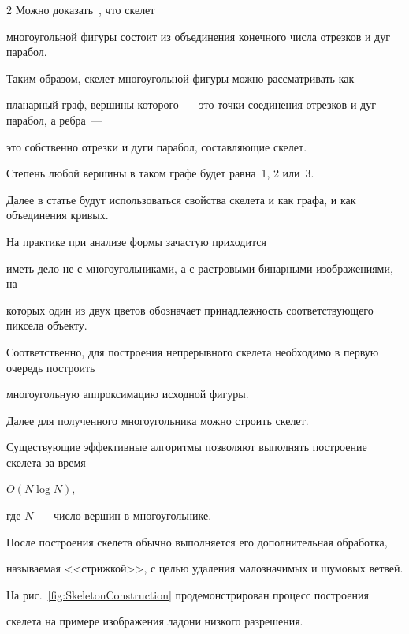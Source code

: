 \begin{multicols}{2}
Можно доказать~\cite{MestetskiySkeletonBezierCurves}, что скелет 


многоугольной фигуры состоит из объединения конечного числа отрезков и дуг парабол.


Таким образом, скелет многоугольной фигуры можно рассматривать как 


планарный граф, вершины которого~--- это точки соединения отрезков и дуг парабол, а ребра~--- 


это собственно отрезки и дуги парабол, составляющие скелет.


Степень любой вершины в таком графе будет рав\-на~1, 2 или~3.





Далее в статье будут использоваться свойства скелета и как графа, и как объединения кривых.





На практике при анализе формы зачастую приходится 


иметь дело не с многоугольниками, а с растровыми бинарными изображениями, на 


которых один из двух цветов обозначает принадлежность соответствующего пиксела объекту.


Соответственно, для построения непрерывного скелета необходимо в первую очередь построить 


многоугольную аппроксимацию исходной фигуры.


Далее для полученного многоугольника можно строить скелет.


Существующие эффективные алгоритмы позволяют выполнять построение скелета за время 


$O(N \log N)$,


где $N$~--- чис\-ло вершин в многоугольнике.


После построения скелета обычно выполняется его дополнительная обработка, 


называемая <<стрижкой>>, с целью удаления малозначимых и шумовых ветвей.


На рис.~\ref{fig:SkeletonConstruction} продемонстрирован процесс построения 


скелета на примере изображения ладони низкого разрешения.





\vspace*{-6pt}






\end{multicols}

